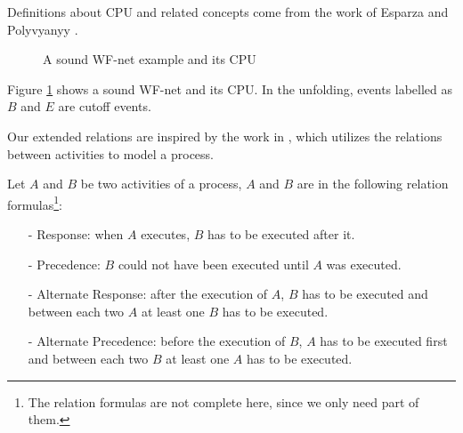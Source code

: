 \documentclass{llncs}
\begin{document}
Definitions about CPU and related concepts come from the work of Esparza \cite{esparza1996improvement} and Polyvyanyy \cite{polyvyanyy2010structuring}.

\begin{figure}[htbp]
\centering
{}
\caption{A sound WF-net example and its CPU\label{fig:examplePetriAndCpu}}
\end{figure}

\begin{example}\label{ex:petriAndCpu}
Figure \ref{fig:examplePetriAndCpu} shows a sound WF-net and its CPU. In the unfolding, events labelled as $B$ and $E$ are cutoff events.
\end{example}

Our extended relations are inspired by the work in \cite{van2006decserflow}, which utilizes the relations between activities to model a process.
\begin{definition}\label{def:relationFormulas}
Let $A$ and $B$ be two activities of a process, $A$ and $B$ are in the following relation formulas\footnote{The relation formulas \cite{van2006decserflow} are not complete here, since we only need part of them.}:
	\begin{itemize}
		\item[-] Response: when $A$ executes, $B$ has to be executed after it.
		\item[-] Precedence: $B$ could not have been executed until $A$ was executed.
		\item[-] Alternate Response: after the execution of $A$, $B$ has to be executed and between each two $A$ at least one $B$ has to be executed.
		\item[-] Alternate Precedence: before the execution of $B$, $A$ has to be executed first and between each two $B$ at least one $A$ has to be executed.
	\end{itemize}
\end{definition}
\end{document}
